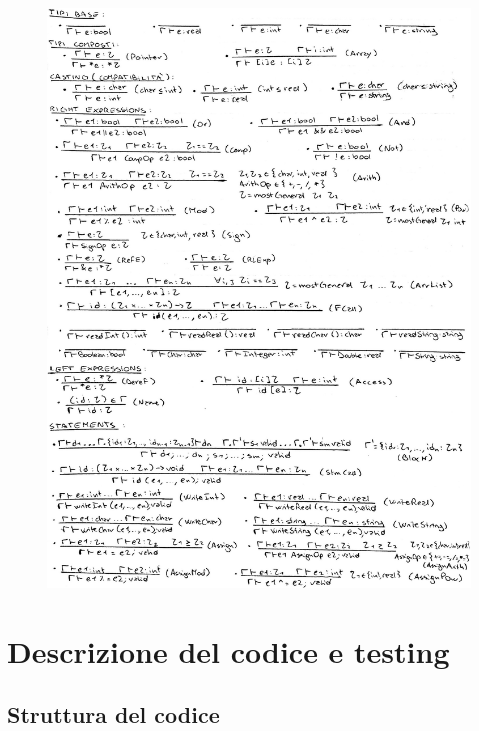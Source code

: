 \documentclass{report}
\begin{document}
\begin{figure}
    \centering
    \includegraphics[width = 1.2\linewidth]{typesystem1}
\end{figure}


\chapter {Descrizione del codice e testing}

\section{Struttura del codice}
\end{document}

